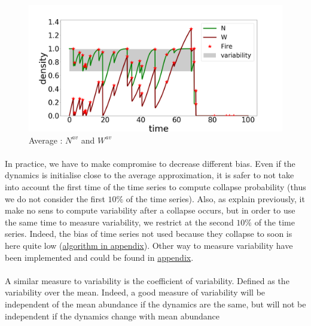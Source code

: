 \documentclass{article}
\begin{document}
\begin{figure}[h!]
\centering
\includegraphics[width=10.cm]{time_series_sd_1.png}
\caption{Average : $N^{av}$ and $W^{av}$}
\end{figure}



\paragraph{}
In practice, we have to make compromise to decrease different bias. Even if the dynamics is initialise close to the average approximation, it is safer to not take into account the first time of the time series to compute collapse probability (thus we do not consider the first $10\%$ of the time series). Also, as explain previously, it make no sens to compute variability after a collapse occurs, but in order to use the same time to measure variability, we restrict at the second $10\%$ of the time series. Indeed, the bias of time series not used because they collapse to soon is here quite low (\hyperref[algo_variability]{algorithm in appendix}). Other way to measure variability have been implemented and could be found in \hyperref[other_variability]{appendix}.



\paragraph{}
A similar measure to variability is the coefficient of variability. Defined as the variability over the mean. Indeed, a good measure of variability will be independent of the mean abundance if the dynamics are the same, but will not be independent if the dynamics change with mean abundance \cite{gaston_measurement_1993}\cite{noauthor_temporal_1994}
\end{document}
